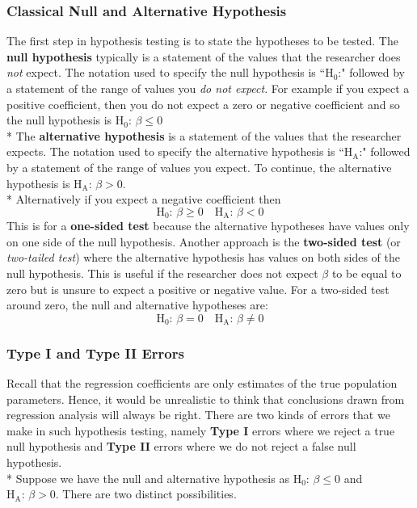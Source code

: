 \documentclass[11pt]{article}
\begin{document}
\subsubsection{Classical Null and Alternative Hypothesis}
The first step in hypothesis testing is to state the hypotheses to be tested. The \textbf{null hypothesis} typically is a statement of the values that the researcher does \textit{not} expect. The notation used to specify the null hypothesis is ``$\text{H}_0\text{:}$" followed by a statement of the range of values you \textit{do not expect}. For example if you expect a positive coefficient, then you do not expect a zero or negative coefficient and so the null hypothesis is $\text{H}_0\text{: } \beta \leq 0$\\*
The \textbf{alternative hypothesis} is a statement of the values that the researcher expects. The notation used to specify the alternative hypothesis is ``H$_\text{A}$:" followed by a statement of the range of values you expect. To continue, the alternative hypothesis is $\text{H}_\text{A}\text{: } \beta > 0$. \\*
Alternatively if you expect a negative coefficient then
$$
\text{H}_0\text{: }\beta \geq 0 \quad \text{H}_\text{A}\text{: } \beta < 0
$$
This is for a \textbf{one-sided test} because the alternative hypotheses have values only on one side of the null hypothesis. Another approach is the \textbf{two-sided test} (or \textit{two-tailed test}) where the alternative hypothesis has values on both sides of the null hypothesis. This is useful if the researcher does not expect $\beta$ to be equal to zero but is unsure to expect a positive or negative value. For a two-sided test around zero, the null and alternative hypotheses are:
$$
\text{H}_0\text{: }\beta = 0 \quad \text{H}_\text{A}\text{: } \beta\neq 0
$$
\subsubsection{Type I and Type II Errors}
Recall that the regression coefficients are only estimates of the true population parameters. Hence, it would be unrealistic to think that conclusions drawn from regression analysis will always be right. There are two kinds of errors that we make in such hypothesis testing, namely \textbf{Type I} errors where we reject a true null hypothesis and \textbf{Type II} errors where we do not reject a false null hypothesis.\\* Suppose we have the null and alternative hypothesis as $\text{H}_0\text{: }\beta \leq 0$ and $\text{H}_\text{A}\text{: } \beta > 0$. There are two distinct possibilities. 
\end{document}

